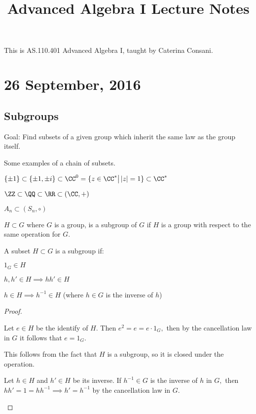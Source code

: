\documentclass{article}
\begin{document}
\title{Advanced Algebra I Lecture Notes}
\maketitle
	This is AS.110.401 Advanced Algebra I, taught by Caterina Consani.

\thispagestyle{fancy}

\tableofcontents

\newpage

\section{26 September, 2016}
\subsection*{Subgroups}

Goal: Find subsets of a given group which inherit the same law as the group itself.

\begin{example*}
	Some examples of a chain of subsets.
	\begin{itemize}
		\ii $\{\pm 1\} \subset \{\pm 1, \pm i\} \subset \CC^0 = \{z\in\CC^* \big\vert\, |z|=1\} \subset \CC^*$

		\ii $\ZZ\subset\QQ\subset\RR\subset(\CC, +)$

		\ii $A_n\subset(S_n, \circ)$
	\end{itemize}
\end{example*}

\begin{definition*}
	$H\subset G$ where $G$ is a group, is a subgroup of $G$ if $H$ is a group with respect to the same operation for $G.$
\end{definition*}

\begin{theorem*}
	A subset $H\subset G$ is a subgroup if:
	\begin{enumerate}
		\ii $1_G\in H$ 

		\ii $h, h'\in H\implies hh'\in H$

		\ii $h\in H\implies h^{-1}\in H$ (where $h\in G$ is the inverse of $h$)
	\end{enumerate}
\end{theorem*}

\begin{proof}
	\begin{enumerate}
		\ii Let $e\in H$ be the identify of $H.$ Then $e^2=e=e\cdot1_G,$ then by the cancellation law in $G$ it follows that $e=1_G.$

		\ii This follows from the fact that $H$ is a subgroup, so it is closed under the operation.

		\ii Let $h\in H$ and $h'\in H$ be its inverse. If $h^{-1}\in G$ is the inverse of $h$ in $G,$ then $hh'=1=hh^{-1}\implies h'=h^{-1}$ by the cancellation law in $G.$
	\end{enumerate}
\end{proof}
\end{document}
